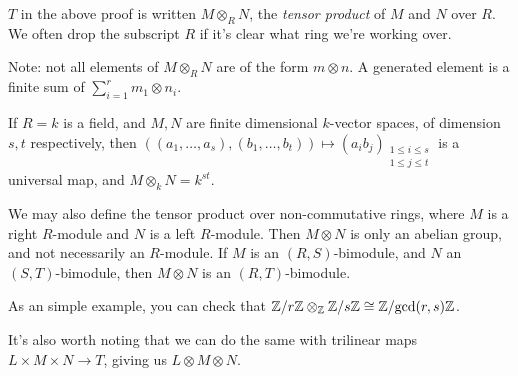 \documentclass[10pt,a4paper]{article}
\begin{document}
\begin{definition}
  $T$ in the above proof is written $M \otimes_R N$, the \emph{tensor product} of $M$ and $N$ over $R$. We often drop the subscript $R$ if it's clear what ring we're working over.
\end{definition}
Note: not all elements of $M\otimes_R N$ are of the form $m \otimes n$. A generated element is a finite sum of $\sum_{i=1}^r m_1 \otimes n_i$.

If $R=k$ is a field, and $M, N$ are finite dimensional $k$-vector spaces, of dimension $s, t$ respectively, then $((a_1, \ldots, a_s), (b_1, \ldots, b_t))\mapsto (a_ib_j)_{\substack{1\leq i\leq s\\1\leq j\leq t}}$ is a universal map, and $M \otimes_k N = k^{st}$.

We may also define the tensor product over non-commutative rings, where $M$ is a right $R$-module and $N$ is a left $R$-module. Then $M \otimes N$ is only an abelian group, and not necessarily an $R$-module. If $M$ is an $(R,S)$-bimodule, and $N$ an $(S,T)$-bimodule, then $M\otimes N$ is an $(R,T)$-bimodule.

As an simple example, you can check that $\mathbb{Z}/r\mathbb{Z} \otimes_{\mathbb{Z}} \mathbb{Z}/s\mathbb{Z} \cong \mathbb{Z}/\text{gcd}(r,s) \mathbb{Z}$.

It's also worth noting that we can do the same with trilinear maps $L\times M\times N \to T$, giving us $L\otimes M \otimes N$.
\end{document}
